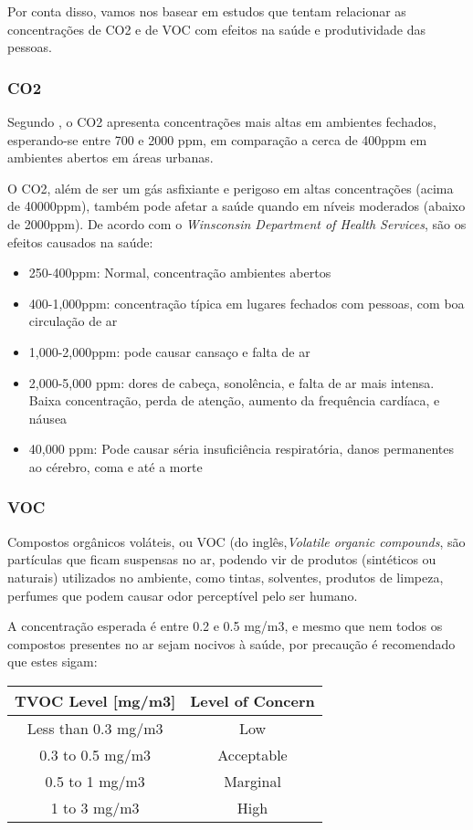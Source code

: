 \documentclass[../monografia.tex]{subfiles}
\begin{document}
Por conta disso, vamos nos basear em estudos que tentam relacionar as concentrações de CO2 e de VOC com efeitos na saúde e produtividade das pessoas. 

\subsubsection{CO2}
Segundo \cite{AirQuality}, o CO2 apresenta concentrações mais altas em ambientes fechados, esperando-se entre 700 e 2000 ppm, em comparação a cerca de 400ppm em ambientes abertos em áreas urbanas\cite{co2Earth}. 

O CO2, além de ser um gás asfixiante e perigoso em altas concentrações (acima de 40000ppm), também pode afetar a saúde quando em níveis moderados (abaixo de 2000ppm). 
De acordo com o \textit{Winsconsin Department of Health Services}\cite{Winsconsin}, são os efeitos causados na saúde: 
\begin{itemize}
\item 250-400ppm: Normal, concentração ambientes abertos
\item 400-1,000ppm: concentração típica em lugares fechados com pessoas, com boa circulação de ar
\item 1,000-2,000ppm: pode causar cansaço e falta de ar
\item 2,000-5,000 ppm: dores de cabeça, sonolência, e falta de ar mais intensa. Baixa concentração, perda de atenção, aumento da frequência cardíaca, e náusea
\item 40,000 ppm: Pode causar séria insuficiência respiratória, danos permanentes ao cérebro, coma e até a morte
\end{itemize}

\subsubsection{VOC}
Compostos orgânicos voláteis, ou VOC (do inglês,\textit{Volatile organic compounds}, são partículas que ficam suspensas no ar, podendo vir de produtos (sintéticos ou naturais) utilizados no ambiente, como tintas, solventes, produtos de limpeza, perfumes que podem causar odor perceptível pelo ser humano\cite{AirQuality}.

A concentração esperada é entre 0.2 e 0.5 mg/m3, e mesmo que nem todos os compostos presentes no ar sejam nocivos à saúde, por precaução é recomendado que estes sigam: \cite{tecam}

\begin{tabular}{ |c|c| }
\hline
TVOC Level [mg/m3]	&   Level of Concern \\
\hline
Less than 0.3 mg/m3	 &  Low \\
0.3 to 0.5 mg/m3	&   Acceptable \\
0.5 to 1 mg/m3	 &  Marginal \\
1 to 3 mg/m3	 &  High \\
\hline
\end{tabular}
\end{document}

